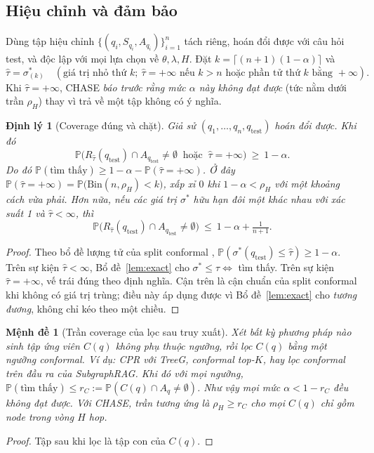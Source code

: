 \documentclass[11pt,a4paper]{article}
\newtheorem{theorem}{Định lý}
\newtheorem{proposition}{Mệnh đề}
\theoremstyle{remark}
\newcommand{\Prob}{\mathbb{P}}
\newcommand{\Aq}{A_q}
\newcommand{\tauhat}{\hat{\tau}}
\newcommand{\method}{\textsc{CHASE}}
\begin{document}
\subsection{Hiệu chỉnh và đảm bảo}\label{sec:calib}
Dùng tập hiệu chỉnh $\{(q_i,S_{q_i},A_{q_i})\}_{i=1}^n$ tách riêng, hoán đổi được với câu hỏi test, và độc lập với mọi lựa chọn về $\theta,\lambda,H$. Đặt $k=\lceil(n+1)(1-\alpha)\rceil$ và
\[
\tauhat=\sigma^*_{(k)}\quad(\text{giá trị nhỏ thứ }k;\ \tauhat=+\infty\text{ nếu }k>n\text{ hoặc phần tử thứ }k\text{ bằng }+\infty).
\]
Khi $\tauhat=+\infty$, \method{} \emph{báo trước rằng mức $\alpha$ này không đạt được} (tức nằm dưới trần $\rho_H$) thay vì trả về một tập không có ý nghĩa.

\begin{theorem}[Coverage đúng và chặt]\label{thm:coverage}
Giả sử $(q_1,\dots,q_n,q_{\mathrm{test}})$ hoán đổi được. Khi đó
\[
\Prob\big(R_{\tauhat}(q_{\mathrm{test}})\cap A_{q_{\mathrm{test}}}\neq\emptyset\ \text{ hoặc }\ \tauhat=+\infty\big)\ \ge\ 1-\alpha .
\]
Do đó $\Prob(\text{tìm thấy})\ge 1-\alpha-\Prob(\tauhat=+\infty)$. Ở đây $\Prob(\tauhat=+\infty)=\Prob\big(\mathrm{Bin}(n,\rho_H)<k\big)$, xấp xỉ $0$ khi $1-\alpha<\rho_H$ với một khoảng cách vừa phải. Hơn nữa, nếu các giá trị $\sigma^*$ hữu hạn đôi một khác nhau với xác suất 1 và $\tauhat<\infty$, thì
\[
\Prob\big(R_{\tauhat}(q_{\mathrm{test}})\cap A_{q_{\mathrm{test}}}\neq\emptyset\big)\ \le\ 1-\alpha+\tfrac{1}{n+1}.
\]
\end{theorem}
\begin{proof}
Theo bổ đề lượng tử của split conformal \cite{vovk2005,lei2018}, $\Prob(\sigma^*(q_{\mathrm{test}})\le\tauhat)\ge1-\alpha$. Trên sự kiện $\tauhat<\infty$, Bổ đề~\ref{lem:exact} cho $\sigma^*\le\tauhat\iff$ tìm thấy. Trên sự kiện $\tauhat=+\infty$, vế trái đúng theo định nghĩa. Cận trên là cận chuẩn của split conformal khi không có giá trị trùng; điều này áp dụng được vì Bổ đề~\ref{lem:exact} cho \emph{tương đương}, không chỉ kéo theo một chiều.
\end{proof}

\begin{proposition}[Trần coverage của lọc sau truy xuất]\label{prop:ceiling}
Xét bất kỳ phương pháp nào sinh tập ứng viên $C(q)$ không phụ thuộc ngưỡng, rồi lọc $C(q)$ bằng một ngưỡng conformal. Ví dụ: CPR với TreeG, conformal top-$K$, hay lọc conformal trên đầu ra của SubgraphRAG. Khi đó với mọi ngưỡng, $\Prob(\text{tìm thấy})\le r_C:=\Prob(C(q)\cap\Aq\neq\emptyset)$. Như vậy mọi mức $\alpha<1-r_C$ đều không đạt được. Với \method{}, trần tương ứng là $\rho_H\ge r_C$ cho mọi $C(q)$ chỉ gồm node trong vòng $H$ hop.
\end{proposition}
\begin{proof}
Tập sau khi lọc là tập con của $C(q)$.
\end{proof}
\end{document}
